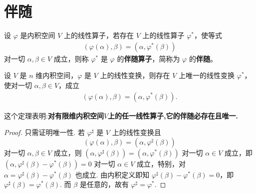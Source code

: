 \documentclass[../../main.tex]{subfiles}%
\begin{document}
\section{伴随}

\begin{definition}[伴随]
设 $\varphi$ 是内积空间 $V$ 上的线性算子，若存在 $V$ 上的线性算子 $\varphi^*$，使等式
\begin{align*}
(\varphi(\alpha),\beta) = (\alpha,\varphi^*(\beta))
\end{align*}
对一切 $\alpha,\beta \in V$ 成立，则称 $\varphi^*$ 是 $\varphi$ 的\textbf{伴随算子}，简称为 $\varphi$ 的\textbf{伴随}。
\end{definition}

\begin{theorem}\label{theorem:有限维空间伴随必存在且唯一}
设 $V$ 是 $n$ 维内积空间，$\varphi$ 是 $V$ 上的线性变换，则存在 $V$ 上唯一的线性变换 $\varphi^*$，使对一切 $\alpha,\beta \in V$，成立
\begin{align*}
(\varphi(\alpha),\beta) = (\alpha,\varphi^*(\beta)).
\end{align*}
\end{theorem}
\begin{note}
这个定理表明:\textbf{对有限维内积空间$V$上的任一线性算子,它的伴随必存在且唯一.}
\end{note}
\begin{proof}
只需证明唯一性. 若 $\varphi^{\sharp}$ 是 $V$ 上的线性变换且
\[
(\varphi(\alpha),\beta) = (\alpha,\varphi^{\sharp}(\beta))
\]
对一切 $\alpha,\beta \in V$ 成立，则 $(\alpha,\varphi^{\sharp}(\beta)) = (\alpha,\varphi^*(\beta))$ 对一切 $\alpha \in V$ 成立，即 $(\alpha,\varphi^{\sharp}(\beta) - \varphi^*(\beta)) = 0$ 对一切 $\alpha \in V$ 成立，特别，对 $\alpha = \varphi^{\sharp}(\beta) - \varphi^*(\beta)$ 也成立. 由内积定义即知 $\varphi^{\sharp}(\beta) - \varphi^*(\beta) = 0$，即 $\varphi^{\sharp}(\beta) = \varphi^*(\beta)$. 而 $\beta$ 是任意的，故有 $\varphi^{\sharp} = \varphi^*$.
\end{proof}
\end{document}
